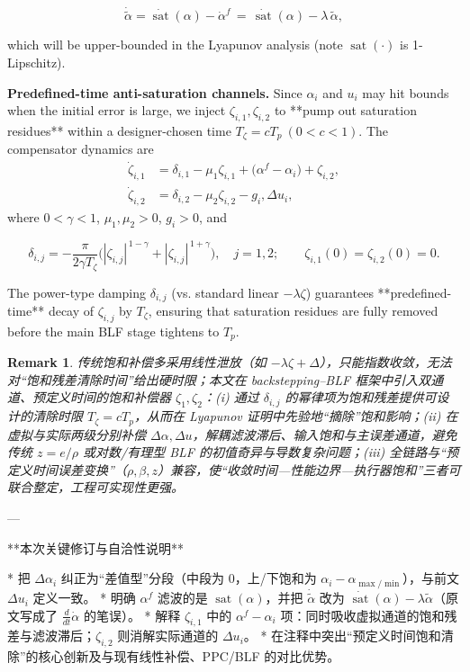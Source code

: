 \documentclass[pdflatex,sn-mathphys-num]{sn-jnl}%
\theoremstyle{thmstyleone}%
\theoremstyle{thmstyletwo}%
\newtheorem{remark}{Remark}%
\theoremstyle{thmstylethree}%
\begin{document}
	$$
	  \dot{\tilde{\alpha}}=\dot{\operatorname{sat}}(\alpha)-\dot{\alpha}^{f}
	  \,=\,\dot{\operatorname{sat}}(\alpha)-\lambda\,\tilde{\alpha},
	$$
	
	which will be upper-bounded in the Lyapunov analysis (note $\operatorname{sat}(\cdot)$ is 1-Lipschitz).
	
	\noindent\textbf{Predefined-time anti-saturation channels.} Since $\alpha_i$ and $u_i$ may hit bounds when the initial error is large, we inject $\zeta_{i,1},\zeta_{i,2}$ to **pump out saturation residues** within a designer-chosen time $T_{\zeta}=cT_{p}\ (0<c<1)$. The compensator dynamics are
	\begin{subequations}\label{eq:24}
	\begin{align}
	\dot\zeta_{i,1}&=\delta_{i,1}-\mu_{1}\zeta_{i,1}
	+\big(\alpha^{f}-\alpha_{i}\big)+\zeta_{i,2},\\
	\dot\zeta_{i,2}&=\delta_{i,2}-\mu_{2}\zeta_{i,2}-g_{i},\Delta u_{i},
	\end{align}
	\end{subequations}
	where $0<\gamma<1$, $\mu_{1},\mu_{2}>0$, $g_i>0$, and
	
	$$
	\delta_{i,j}
	=-\frac{\pi}{2\gamma T_{\zeta}}
	\Big(|\zeta_{i,j}|^{\,1-\gamma}+|\zeta_{i,j}|^{\,1+\gamma}\Big),\quad
	j=1,2;\qquad
	\zeta_{i,1}(0)=\zeta_{i,2}(0)=0.
	$$
	
	The power-type damping $\delta_{i,j}$ (vs. standard linear $-\lambda\zeta$) guarantees **predefined-time** decay of $\zeta_{i,j}$ by $T_{\zeta}$, ensuring that saturation residues are fully removed before the main BLF stage tightens to $T_p$.
	
	\begin{remark}
	传统饱和补偿多采用线性泄放（如 $-\lambda\zeta+\Delta$），只能指数收敛，无法对“饱和残差清除时间”给出硬时限；本文在 backstepping–BLF 框架中引入\emph{双通道、预定义时间}的饱和补偿器 $\zeta_{1},\zeta_{2}$：(i) 通过 $\delta_{i,j}$ 的幂律项为饱和残差提供可设计的清除时限 $T_{\zeta}=cT_p$，从而在 Lyapunov 证明中先验地“摘除”饱和影响；(ii) 在虚拟与实际两级分别补偿 $\Delta\alpha,\Delta u$，\emph{解耦}滤波滞后、输入饱和与主误差通道，避免传统 $z=e/\rho$ 或对数/有理型 BLF 的初值奇异与导数复杂问题；(iii) 全链路与“预定义时间误差变换”（$\rho,\beta,z$）兼容，使“收敛时间—性能边界—执行器饱和”三者可联合整定，工程可实现性更强。
	\end{remark}
	
	---
	
	**本次关键修订与自洽性说明**
	
	* 把 $\Delta\alpha_i$ 纠正为“差值型”分段（中段为 0，上/下饱和为 $\alpha_i-\alpha_{\max/\min}$），与前文 $\Delta u_i$ 定义一致。
	* 明确 $\alpha^{f}$ 滤波的是 $\operatorname{sat}(\alpha)$，并把 $\dot{\tilde\alpha}$ 改为 $\dot{\operatorname{sat}}(\alpha)-\lambda\tilde\alpha$（原文写成了 $\frac{d}{dt}\dot\alpha$ 的笔误）。
	* 解释 $\zeta_{i,1}$ 中的 $\alpha^{f}-\alpha_i$ 项：同时吸收虚拟通道的饱和残差与滤波滞后；$\zeta_{i,2}$ 则消解实际通道的 $\Delta u_i$。
	* 在注释中突出“预定义时间饱和清除”的核心创新及与现有线性补偿、PPC/BLF 的对比优势。
	
\end{document}
